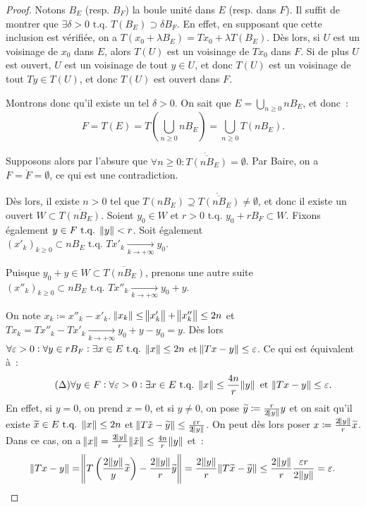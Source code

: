 \documentclass{report}
\newcommand{\tq}{\text{ t.q. }}
\newcommand{\st}{\tq}
\newcommand{\pinfty}{{+\infty}}
\theoremstyle{definition}
\theoremstyle{remark}
\begin{document}
\begin{proof} Notons $B_E$ (resp. $B_F$) la boule unité dans $E$ (resp. dans $F$). Il suffit de montrer que $\exists \delta > 0 \st T(B_E) \supset \delta B_F$.
En effet, en supposant que cette inclusion est vérifiée, on a $T(x_0 + \lambda B_E) = Tx_0 + \lambda T(B_E)$. Dès lors, si $U$ est un voisinage de $x_0$ dans $E$,
alors $T(U)$ est un voisinage de $Tx_0$ dans $F$. Si de plus $U$ est ouvert, $U$ est un voisinage de tout $y \in U$, et donc $T(U)$ est un voisinage de tout $Ty \in T(U)$,
et donc $T(U)$ est ouvert dans $F$.

Montrons donc qu'il existe un tel $\delta > 0$. On sait que $E = \bigcup_{n \geq 0}n B_E$, et donc~:
\[F = T(E) = T\left(\bigcup_{n \geq 0}n B_E\right) = \bigcup_{n \geq 0}T(n B_E).\]

Supposons alors par l'absure que $\forall n \geq 0 : \mathring {\overline {T(nB_E)}} = \emptyset$. Par Baire, on a $F = \mathring F = \emptyset$, ce qui est une contradiction.

Dès lors, il existe $n > 0$ tel que $T(nB_E) \supseteq \mathring {\overline {T(nB_E)}} \neq \emptyset$, et donc il existe un ouvert $W \subset \overline {T(nB_E)}$. Soient $y_0 \in W$
et $r > 0 \st y_0 + rB_F \subset W$. Fixons également $y \in F \st \norm y < r$. Soit également $(x'_k)_{k \geq 0} \subset nB_E \st Tx'_k \xrightarrow[k \to \pinfty]{} y_0$.

Puisque $y_0+y \in W \subset \overline {T(nB_E)}$, prenons une autre suite $(x''_k)_{k \geq 0} \subset nB_E \st Tx''_k \xrightarrow[k \to \pinfty]{} y_0+y$.

On note $x_k \coloneqq x''_k - x'_k$. $\norm {x_k} \leq \norm {x'_k} + \norm {x''_k} \leq 2n$ et $Tx_k = Tx''_k - Tx'_k \xrightarrow[k \to \pinfty]{} y_0+y-y_0 = y$.
Dès lors $\forall \varepsilon > 0 : \forall y \in rB_F : \exists x \in E \st \norm x \leq 2n$ et $\norm {Tx-y} \leq \varepsilon$. Ce qui est équivalent à~:
\begin{equation}\tag{$\Delta$}\label{eq:Delta}
	\forall y \in F : \forall \varepsilon > 0 : \exists x \in E \st \norm x \leq \frac {4n}r\norm y \text{ et } \norm {Tx - y} \leq \varepsilon.
\end{equation}
En effet, si $y = 0$, on prend $x=0$, et si $y \neq 0$, on pose $\widetilde y \coloneqq \frac r{2\norm y}y$ et on sait qu'il existe
$\widetilde x \in E \st \norm x \leq 2n$ et $\norm {T\tilde x - \widetilde y} \leq \frac {\varepsilon r}{2\norm y}$. On peut dès lors poser $x \coloneqq \frac {2\norm y}r\widetilde x$.
Dans ce cas, on a $\norm x = \frac {2\norm y}r\norm {\tilde x} \leq \frac {4n}r\norm y$ et~:
\[\norm {Tx-y} = \norm {T\left(\frac {2\norm y}y\widetilde x\right) - \frac {2\norm y}r\widetilde y} = \frac {2\norm y}r\norm {T\widetilde x - \widetilde y}
\leq \frac {2\norm y}r\frac {\varepsilon r}{2\norm y} = \varepsilon.\]


\end{proof}
\end{document}
